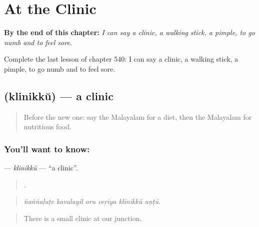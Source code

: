 
\chapter{At the Clinic}
\label{ch:ml-at-the-clinic}

\begin{chapteropening}
\textbf{By the end of this chapter:} \emph{I can say a clinic, a walking stick, a pimple, to go numb and to feel sore.}

Complete the last lesson of chapter 540: I can say a clinic, a walking stick, a pimple, to go numb and to feel sore.
\end{chapteropening}

\section[\texorpdfstring{\ml{ക്ലിനിക്ക്} (klinikkŭ)}{ക്ലിനിക്ക് (klinikkŭ)}]{ (klinikkŭ) — a clinic}

\label{lesson:ML-C540-klinikku}



\begin{quote}
Before the new one: say the Malayalam for a diet, then the Malayalam for nutritious food.
\end{quote}

\subsection*{You'll want to know: }
\textbf{} — \emph{klinikkŭ} — \textquotedblleft{}a clinic\textquotedblright{}.

\begin{quote}
     .
\end{quote}

\begin{quote}
\emph{ñaṅṅaḷuṭe kavalayil oru ceṟiya klinikkŭ uṇṭŭ.}
\end{quote}

\begin{quote}
There is a small clinic at our junction.
\end{quote}

